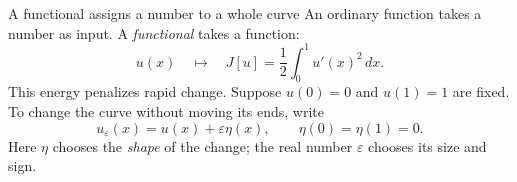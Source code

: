 \documentclass[11pt]{beamer}
\newcommand{\dd}{\,d}
\begin{document}
\begin{frame}{A functional assigns a number to a whole curve}
\small
An ordinary function takes a number as input. A \emph{functional} takes a function:
\[
 u(x)\quad\longmapsto\quad J[u]=\frac12\int_0^1 u'(x)^2\dd x.
\]
This energy penalizes rapid change. Suppose $u(0)=0$ and $u(1)=1$ are fixed.
To change the curve without moving its ends, write
\begin{equation}
 u_\varepsilon(x)=u(x)+\varepsilon\eta(x),\qquad \eta(0)=\eta(1)=0.
 \label{eq:variation}
\end{equation}
Here $\eta$ chooses the \emph{shape} of the change; the real number $\varepsilon$
chooses its size and sign.
\begin{center}
\end{center}
\end{frame}
\end{document}
